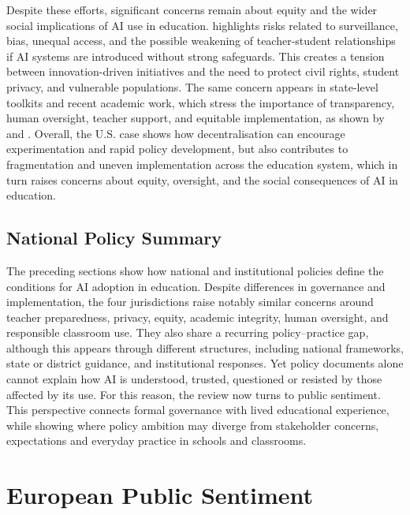 Despite these efforts, significant concerns remain about equity and the wider social
implications of AI use in education. \cite{pennsylvaniausccr2024rising} highlights
risks related to surveillance, bias, unequal access, and the possible weakening of
teacher-student relationships if AI systems are introduced without strong safeguards.
This creates a tension between innovation-driven initiatives and the need to protect
civil rights, student privacy, and vulnerable populations. The same concern appears
in state-level toolkits and recent academic work, which stress the importance of
transparency, human oversight, teacher support, and equitable implementation, as
shown by \cite{oklahoma2025policytoolkit} and \cite{medina2026newai}. Overall, the
U.S. case shows how decentralisation can encourage experimentation and rapid policy
development, but also contributes to fragmentation and uneven implementation across
the education system, which in turn raises concerns about equity, oversight, and the
social consequences of AI in education.

\subsection{National Policy Summary}

The preceding sections show how national and institutional policies define the
conditions for AI adoption in education. Despite differences in governance and
implementation, the four jurisdictions raise notably similar concerns around teacher
preparedness, privacy, equity, academic integrity, human oversight, and responsible
classroom use. They also share a recurring policy--practice gap, although this
appears through different structures, including national frameworks, state or
district guidance, and institutional responses. Yet policy documents alone cannot
explain how AI is understood, trusted, questioned or resisted by those affected by
its use. For this reason, the review now turns to public sentiment. This perspective
connects formal governance with lived educational experience, while showing where
policy ambition may diverge from stakeholder concerns, expectations and everyday
practice in schools and classrooms.

\section{European Public Sentiment}
\label{c1:eps}

